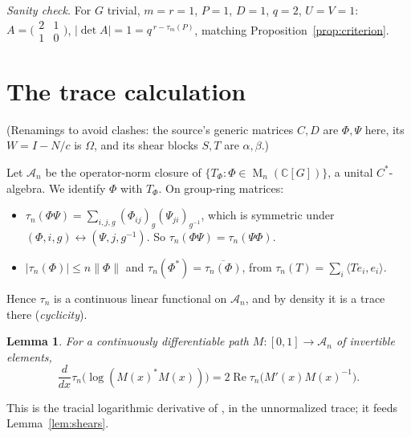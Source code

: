 \documentclass[11pt]{article}
\newtheorem{lemma}[theorem]{Lemma}
\theoremstyle{remark}
\numberwithin{equation}{section}
\newcommand{\C}{\mathbb C}
\newcommand{\Mat}{\operatorname{M}}
\begin{document}
\emph{Sanity check.} For $G$ trivial, $m=r=1$, $P=1$, $D=1$, $q=2$, $U=V=1$: $A=\bigl(\begin{smallmatrix}2&1\\1&0\end{smallmatrix}\bigr)$, $|\det A|=1=q^{\,r-\tau_m(P)}$, matching Proposition~\ref{prop:criterion}.

\section{The trace calculation}
\label{sec:analysis}

(Renamings to avoid clashes: the source's generic matrices $C,D$ are $\Phi,\Psi$ here, its $W=I-N/c$ is $\Omega$, and its shear blocks $S,T$ are $\alpha,\beta$.)

Let $\mathcal A_n$ be the operator-norm closure of $\{T_\Phi:\Phi\in\Mat_n(\C[G])\}$, a unital $C^*$-algebra. We identify $\Phi$ with $T_\Phi$. On group-ring matrices:
\begin{itemize}[leftmargin=2em,itemsep=1pt]
\item $\tau_n(\Phi\Psi)=\sum_{i,j,g}(\Phi_{ij})_g(\Psi_{ji})_{g^{-1}}$, which is symmetric under $(\Phi,i,g)\leftrightarrow(\Psi,j,g^{-1})$. So $\tau_n(\Phi\Psi)=\tau_n(\Psi\Phi)$.
\item $|\tau_n(\Phi)|\le n\|\Phi\|$ and $\tau_n(\Phi^*)=\overline{\tau_n(\Phi)}$, from $\tau_n(T)=\sum_i\langle Te_i,e_i\rangle$.
\end{itemize}
Hence $\tau_n$ is a continuous linear functional on $\mathcal A_n$, and by density it is a trace there (\emph{cyclicity}).

\begin{lemma}\label{lem:logderivative}
For a continuously differentiable path
$M:[0,1]\to\mathcal A_n$ of invertible elements,
\[
 \frac{d}{dx}\tau_n\bigl(\log(M(x)^*M(x))\bigr)
 =2\operatorname{Re}\tau_n\bigl(M'(x)M(x)^{-1}\bigr).
\]
\end{lemma}

This is the tracial logarithmic derivative of \cite[Lemma 2]{FK1952}, in the unnormalized trace; it feeds Lemma~\ref{lem:shears}.
\end{document}
